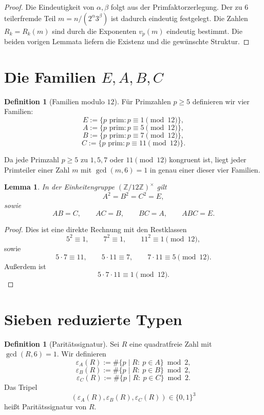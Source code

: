 \documentclass[11pt,a4paper]{article}
\newtheorem{lemma}[satz]{Lemma}
\theoremstyle{definition}
\newtheorem{definition}[satz]{Definition}
\theoremstyle{remark}
\begin{document}
	\begin{proof}
		Die Eindeutigkeit von \(\alpha,\beta\) folgt aus der Primfaktorzerlegung. Der zu \(6\) teilerfremde
		Teil \(m=n/(2^\alpha 3^\beta)\) ist dadurch eindeutig festgelegt. Die Zahlen \(R_k=R_k(m)\) sind
		durch die Exponenten \(v_p(m)\) eindeutig bestimmt. Die beiden vorigen Lemmata liefern die Existenz
		und die gewünschte Struktur.
	\end{proof}
	
	\section{Die Familien \(E,A,B,C\)}
	
	\begin{definition}[Familien modulo \(12\)]
		Für Primzahlen \(p\ge 5\) definieren wir vier Familien:
		\[
		E:=\{p\text{ prim}: p\equiv 1 \pmod{12}\},
		\]
		\[
		A:=\{p\text{ prim}: p\equiv 5 \pmod{12}\},
		\]
		\[
		B:=\{p\text{ prim}: p\equiv 7 \pmod{12}\},
		\]
		\[
		C:=\{p\text{ prim}: p\equiv 11 \pmod{12}\}.
		\]
	\end{definition}
	
	Da jede Primzahl \(p\ge 5\) zu \(1,5,7\) oder \(11 \pmod{12}\) kongruent ist, liegt jeder Primteiler
	einer Zahl \(m\) mit \(\gcd(m,6)=1\) in genau einer dieser vier Familien.
	
	\begin{lemma}
		In der Einheitengruppe \((\mathbb{Z}/12\mathbb{Z})^\times\) gilt
		\[
		A^2=B^2=C^2=E,
		\]
		sowie
		\[
		AB=C,\qquad AC=B,\qquad BC=A,\qquad ABC=E.
		\]
	\end{lemma}
	
	\begin{proof}
		Dies ist eine direkte Rechnung mit den Restklassen
		\[
		5^2\equiv 1,\qquad 7^2\equiv 1,\qquad 11^2\equiv 1 \pmod{12},
		\]
		sowie
		\[
		5\cdot 7\equiv 11,\qquad 5\cdot 11\equiv 7,\qquad 7\cdot 11\equiv 5 \pmod{12}.
		\]
		Außerdem ist
		\[
		5\cdot 7\cdot 11\equiv 1 \pmod{12}.
		\]
	\end{proof}
	
	\section{Sieben reduzierte Typen}
	
	\begin{definition}[Paritätssignatur]
		Sei \(R\) eine quadratfreie Zahl mit \(\gcd(R,6)=1\). Wir definieren
		\[
		\varepsilon_A(R):=\#\{p\mid R:\ p\in A\}\bmod 2,
		\]
		\[
		\varepsilon_B(R):=\#\{p\mid R:\ p\in B\}\bmod 2,
		\]
		\[
		\varepsilon_C(R):=\#\{p\mid R:\ p\in C\}\bmod 2.
		\]
		Das Tripel
		\[
		(\varepsilon_A(R),\varepsilon_B(R),\varepsilon_C(R))\in\{0,1\}^3
		\]
		heißt Paritätssignatur von \(R\).
	\end{definition}
	
\end{document}
